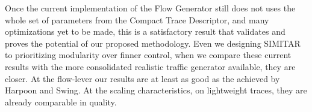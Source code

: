 Once the current implementation of the Flow Generator still does not uses the whole set of parameters from the Compact Trace Descriptor, and many optimizations yet to be made, this is a satisfactory result that validates and proves the potential of our proposed methodology. Even we designing  SIMITAR  to prioritizing modularity over finner control, when we compare these current results with the more consolidated realistic traffic generator available, they are closer. At the flow-lever our results are at least as good as the achieved by Harpoon\cite{harpoon-paper} and Swing\cite{swing-paper}. At the scaling characteristics, on lightweight traces, they are already comparable in quality.








